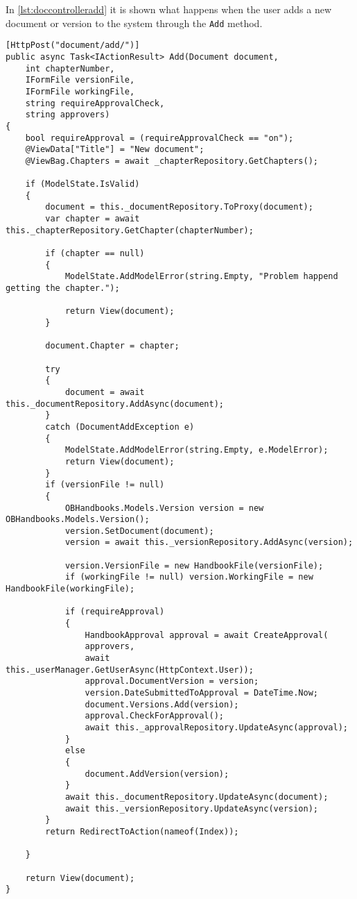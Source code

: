 In \cref{lst:doccontrolleradd} it is shown what happens when the user adds a new document or version to the system through the \texttt{Add} method.
\\
\begin{lstlisting}[caption={Document Controller: Add}, label={lst:doccontrolleradd}]
[HttpPost("document/add/")]
public async Task<IActionResult> Add(Document document,
	int chapterNumber,
	IFormFile versionFile,
	IFormFile workingFile,
	string requireApprovalCheck,
	string approvers)
{
	bool requireApproval = (requireApprovalCheck == "on");
	@ViewData["Title"] = "New document";
	@ViewBag.Chapters = await _chapterRepository.GetChapters();

	if (ModelState.IsValid)
	{
		document = this._documentRepository.ToProxy(document);
		var chapter = await this._chapterRepository.GetChapter(chapterNumber);

		if (chapter == null)
		{
			ModelState.AddModelError(string.Empty, "Problem happend getting the chapter.");

			return View(document);
		}

		document.Chapter = chapter;

		try
		{
			document = await this._documentRepository.AddAsync(document);
		}
		catch (DocumentAddException e)
		{
			ModelState.AddModelError(string.Empty, e.ModelError);
			return View(document);
		}
		if (versionFile != null)
		{
			OBHandbooks.Models.Version version = new OBHandbooks.Models.Version();
			version.SetDocument(document);
			version = await this._versionRepository.AddAsync(version);

			version.VersionFile = new HandbookFile(versionFile);
			if (workingFile != null) version.WorkingFile = new HandbookFile(workingFile);

			if (requireApproval)
			{
				HandbookApproval approval = await CreateApproval(
				approvers,
				await this._userManager.GetUserAsync(HttpContext.User));
				approval.DocumentVersion = version;
				version.DateSubmittedToApproval = DateTime.Now;
				document.Versions.Add(version);
				approval.CheckForApproval();
				await this._approvalRepository.UpdateAsync(approval);
			}
			else
			{
				document.AddVersion(version);
			}
			await this._documentRepository.UpdateAsync(document);
			await this._versionRepository.UpdateAsync(version);
		}
		return RedirectToAction(nameof(Index));

	}

	return View(document);
}
\end{lstlisting}

